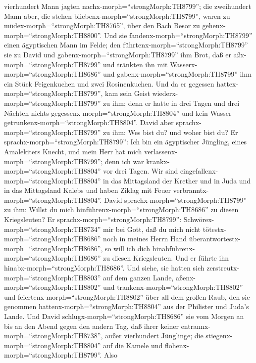 vierhundert Mann jagten nachx-morph=``strongMorph:TH8799''; die
zweihundert Mann aber, die stehen bliebenx-morph=``strongMorph:TH8799'',
waren zu müdex-morph=``strongMorph:TH8765'', über den Bach Besor zu
gehenx-morph=``strongMorph:TH8800''.  Und sie
fandenx-morph=``strongMorph:TH8799'' einen ägyptischen Mann im Felde;
den führtenx-morph=``strongMorph:TH8799'' sie zu David und
gabenx-morph=``strongMorph:TH8799'' ihm Brot, daß er
aßx-morph=``strongMorph:TH8799'' und tränkten ihn mit
Wasserx-morph=``strongMorph:TH8686''  und
gabenx-morph=``strongMorph:TH8799'' ihm ein Stück Feigenkuchen und zwei
Rosinenkuchen. Und da er gegessen hattex-morph=``strongMorph:TH8799'',
kam sein Geist wiederx-morph=``strongMorph:TH8799'' zu ihm; denn er
hatte in drei Tagen und drei Nächten nichts
gegessenx-morph=``strongMorph:TH8804'' und kein Wasser
getrunkenx-morph=``strongMorph:TH8804''.  David aber
sprachx-morph=``strongMorph:TH8799'' zu ihm: Wes bist du? und woher bist
du? Er sprachx-morph=``strongMorph:TH8799'': Ich bin ein ägyptischer
Jüngling, eines Amalekiters Knecht, und mein Herr hat mich
verlassenx-morph=``strongMorph:TH8799''; denn ich war
krankx-morph=``strongMorph:TH8804'' vor drei Tagen.  Wir
sind eingefallenx-morph=``strongMorph:TH8804'' in das Mittagsland der
Krether und in Juda und in das Mittagsland Kalebs und haben Ziklag mit
Feuer verbranntx-morph=``strongMorph:TH8804''.  David
sprachx-morph=``strongMorph:TH8799'' zu ihm: Willst du mich
hinführenx-morph=``strongMorph:TH8686'' zu diesen Kriegsleuten? Er
sprachx-morph=``strongMorph:TH8799'':
Schwörex-morph=``strongMorph:TH8734'' mir bei Gott, daß du mich nicht
tötestx-morph=``strongMorph:TH8686'' noch in meines Herrn Hand
überantwortestx-morph=``strongMorph:TH8686'', so will ich dich
hinabführenx-morph=``strongMorph:TH8686'' zu diesen Kriegsleuten.
 Und er führte ihn hinabx-morph=``strongMorph:TH8686''. Und
siehe, sie hatten sich zerstreutx-morph=``strongMorph:TH8803'' auf dem
ganzen Lande, aßenx-morph=``strongMorph:TH8802'' und
trankenx-morph=``strongMorph:TH8802'' und
feiertenx-morph=``strongMorph:TH8802'' über all dem großen Raub, den sie
genommen hattenx-morph=``strongMorph:TH8804'' aus der Philister und
Juda's Lande.  Und David
schlugx-morph=``strongMorph:TH8686'' sie vom Morgen an bis an den Abend
gegen den andern Tag, daß ihrer keiner
entrannx-morph=``strongMorph:TH8738'', außer vierhundert Jünglinge; die
stiegenx-morph=``strongMorph:TH8804'' auf die Kamele und
flohenx-morph=``strongMorph:TH8799''.  Also
